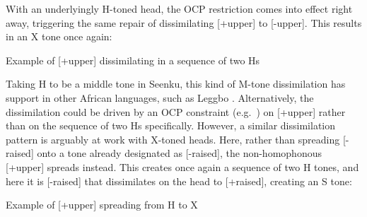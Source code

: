 \documentclass[output=paper]{langsci/langscibook}
\begin{document}
With an underlyingly H-toned head, the OCP restriction comes into effect right away, triggering the same repair of dissimilating [+upper] to [-upper]. This results in an X tone once again:

\ea\label{ex:mcpherson:24} Example of [+upper] dissimilating in a sequence of two Hs \\
\z

Taking H to be a middle tone in Seenku, this kind of M-tone dissimilation has support in other African languages, such as Leggbo \citep{Paster03}. Alternatively, the dissimilation could be driven by an OCP constraint (e.g.\ \citealt{McCarthy86}) on [+upper] rather than on the sequence of two Hs specifically. However, a similar dissimilation pattern is arguably at work with X-toned heads. Here, rather than spreading [-raised] onto a tone already designated as [-raised], the non-homophonous [+upper] spreads instead. This creates once again a sequence of two H tones, and here it is [-raised] that dissimilates on the head to [+raised], creating an S tone:

\ea\label{ex:mcpherson:25} Example of [+upper] spreading from H to X \\
\z
\end{document}
